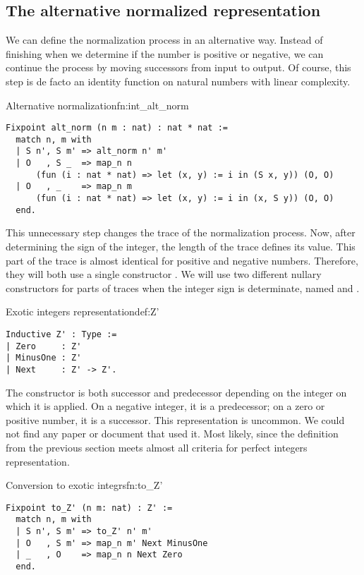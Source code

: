 \subsection{The alternative normalized representation}
We can define the normalization process in an alternative way. Instead of finishing when we determine if the number is positive or negative, we can continue the process by moving successors from input to output. Of course, this step is de facto an identity function on natural numbers with linear complexity.
\begin{func}{Alternative normalization}{fn:int_alt_norm}
\begin{verbatim}
Fixpoint alt_norm (n m : nat) : nat * nat :=
  match n, m with
  | S n', S m' => alt_norm n' m'
  | O   , S _  => map_n n 
      (fun (i : nat * nat) => let (x, y) := i in (S x, y)) (O, O)
  | O   , _    => map_n m 
      (fun (i : nat * nat) => let (x, y) := i in (x, S y)) (O, O)
  end.
\end{verbatim}
\end{func}
This unnecessary step changes the trace of the normalization process. Now, after determining the sign of the integer, the length of the trace defines its value. This part of the trace is almost identical for positive and negative numbers. Therefore, they will both use a single constructor . We will use two different nullary constructors for parts of traces when the integer sign is determinate, named  and .
\begin{defi}{Exotic integers representation}{def:Z'}
\begin{verbatim}
Inductive Z' : Type :=
| Zero     : Z'
| MinusOne : Z'
| Next     : Z' -> Z'.
\end{verbatim}
\end{defi}
The  constructor is both successor and predecessor depending on the integer on which it is applied. On a negative integer, it is a predecessor; on a zero or positive number, it is a successor. This representation is uncommon. We could not find any paper or document that used it. Most likely, since the definition from the previous section meets almost all criteria for perfect integers representation.
\begin{func}{Conversion to exotic integrs}{fn:to_Z'}
\begin{verbatim}
Fixpoint to_Z' (n m: nat) : Z' :=
  match n, m with
  | S n', S m' => to_Z' n' m'
  | O   , S m' => map_n m' Next MinusOne
  | _   , O    => map_n n Next Zero
  end.
\end{verbatim}
\end{func}
